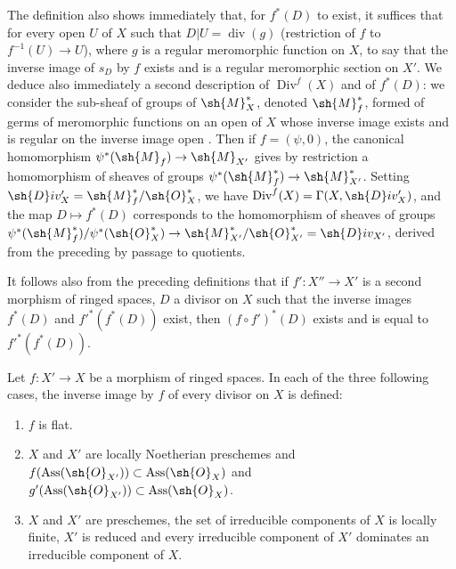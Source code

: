 \begin{env}[21.4.3]
\label{IV.21.4.3}
The definition  also shows immediately that, for $f^*(D)$ to exist, it suffices that for every open $U$ of $X$ such that $D|U=\operatorname{div}(g)$ (restriction of $f$ to $f^{-1}(U)\to U$), where $g$ is a regular meromorphic function on $X$, to say that the inverse image of $s_D$ by $f$ exists and is a regular meromorphic section on $X'$.
We deduce also immediately a second description of $\operatorname{Div}^f(X)$ and of $f^*(D)$: we consider the sub-sheaf of groups of $\sh{M}_X^*$, denoted $\sh{M}_f^*$, formed of germs of meromorphic functions on an open of $X$ whose inverse image exists and is regular on the inverse image open .
Then if $f=(\psi,0)$, the canonical homomorphism  $\psi^*(\sh{M}_f)\to\sh{M}_{X'}$ gives by restriction a homomorphism of sheaves of groups $\psi^*(\sh{M}_f^*)\to\sh{M}_{X'}^*$.
Setting $\sh{D}iv_X'=\sh{M}_f^*/\sh{O}_X^*$, we have $\operatorname{Div}^f(X)=\Gamma(X,\sh{D}iv_X')$, and the map $D\mapsto f^*(D)$ corresponds to the homomorphism of sheaves of groups $\psi^*(\sh{M}_f^*)/\psi^*(\sh{O}_X^*)\to\sh{M}_{X'}^*/\sh{O}_{X'}^*=\sh{D}iv_{X'}$, derived from the preceding by passage to quotients.
\end{env}

\begin{env}[21.4.4]
\label{IV.21.4.4}
It follows also from the preceding definitions that if $f':X''\to X'$ is a second morphism of ringed spaces, $D$ a divisor on $X$ such that the inverse images $f^*(D)$ and $f'^*(f^*(D))$ exist, then $(f\circ f')^*(D)$ exists and is equal to $f'^*(f^*(D))$.
\end{env}

\begin{proposition}[21.4.5]
\label{IV.21.4.5}
Let $f:X'\to X$ be a morphism of ringed spaces.
In each of the three following cases, the inverse image by $f$ of every divisor on $X$ is defined:
\begin{enumerate}[label=(\roman*)]
  \item $f$ is flat.
  \item $X$ and $X'$ are locally Noetherian preschemes and $f(\operatorname{Ass}(\sh{O}_{X'}))\subset\operatorname{Ass}(\sh{O}_X)$ and $g'(\operatorname{Ass}(\sh{O}_{X'}))\subset\operatorname{Ass}(\sh{O}_X)$.
  \item $X$ and $X'$ are preschemes, the set of irreducible components of $X$ is locally finite, $X'$ is reduced and every irreducible component of $X'$ dominates an irreducible component of $X$.
\end{enumerate}
\end{proposition}

